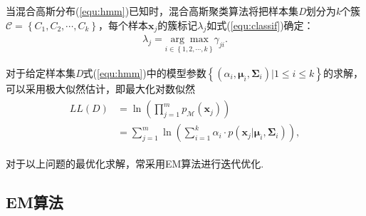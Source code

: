 \documentclass{hitreport}
\begin{document}
当混合高斯分布(\ref{equ:hmm})已知时，混合高斯聚类算法将把样本集\textit{D}划分为\textit{k}个簇$\mathcal{C} = \left\{C_1,C_2, \cdots, C_k\right\}$，每个样本$\boldsymbol{x}_j$的簇标记$\lambda_j$如式(\ref{equ:classif})确定：
\begin{align}\label{equ:classif}
\lambda_j = \underset{i\in \left\{1,2,\cdots,k\right\}}{\arg\max}\gamma_{ji}.
\end{align}

对于给定样本集\textit{D}式(\ref{equ:hmm})中的模型参数$\left\{\left(\alpha_i, \boldsymbol{\mu}_i, \boldsymbol{\Sigma}_i\right)|1\le i\le k\right\}$的求解，可以采用极大似然估计，即最大化对数似然
\begin{align}\label{equ:lld}
\begin{split}
LL\left(D\right) & = \ln \left(\prod_{j=1}^{m}p_{\mathcal{M}}\left(\boldsymbol{x}_j\right)\right)\\
& = \sum_{j=1}^{m}\ln \left(\sum_{i=1}^{k}\alpha_i\cdot p\left(\boldsymbol{x}_j| \boldsymbol{\mu}_i, \boldsymbol{\Sigma}_i\right)\right),
\end{split}
\end{align}

对于以上问题的最优化求解，常采用EM算法进行迭代优化. 

\subsection{EM算法}
\end{document}
